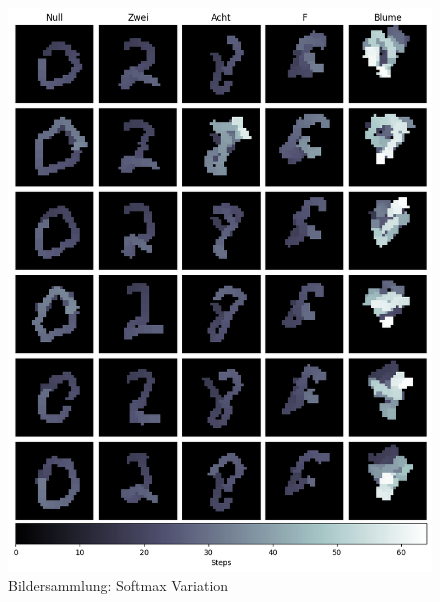 \begin{figure}[!ht]
    \centering
    \includegraphics[width=\textwidth]{images/resultate/generative-sm.png}
    \caption{Bildersammlung: Softmax Variation}\label{fig:r-softmax}
\end{figure}

